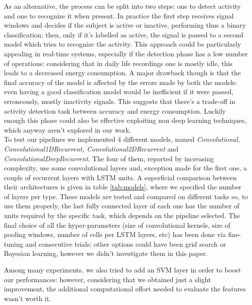 As an alternative, the process can be split into two steps: one to detect activity and one to recognize it when present. In practice the first step receives signal windows and decides if the subject is active or inactive, performing thus a binary classification; then, only if it’s labelled as active, the signal is passed to a second model which tries to recognize the activity. This approach could be particularly appealing in real-time systems, especially if the detection phase has a low number of operations: considering that in daily life recordings one is mostly idle, this leads to a decreased energy consumption. A major drawback though is that the final accuracy of the model is affected by the errors made by both the models: even having a good classification model would be inefficient if it were passed, erroneously, mostly inactivity signals. This suggests that there’s a trade-off in activity detection task between accuracy and energy consumption. Luckily enough this phase could also be effective exploiting non deep learning techniques, which anyway aren't explored in our work.\\

To test our pipelines we implemented 4 different models, named \textit{Convolutional, Convolutional1DRecurrent, Convolutional2DRecurrent} and \textit{ConvolutionalDeepRecurrent}. The four of them, reported by increasing complexity, use some convolutional layers and, exception made for the first one, a couple of recurrent layers with LSTM units. A superficial comparison between their architectures is given in table \ref{tab:models}, where we specified the number of layers per type. 
These models are tested and compared on different tasks so, to use them properly, the last fully connected layer of each one has the number of units required by the specific task, which depends on the pipeline selected. The final choice of all the hyper-parameters (size of convolutional kernels, size of pooling windows, number of cells per LSTM layers, etc) has been done via fine-tuning and consecutive trials: other options could have been grid search or Bayesian learning, however we didn't investigate them in this paper.

Among many experiments, we also tried to add an SVM layer in order to boost our performances: however, considering that we obtained just a slight improvement, the additional computational effort needed to evaluate the features wasn't worth it. 
